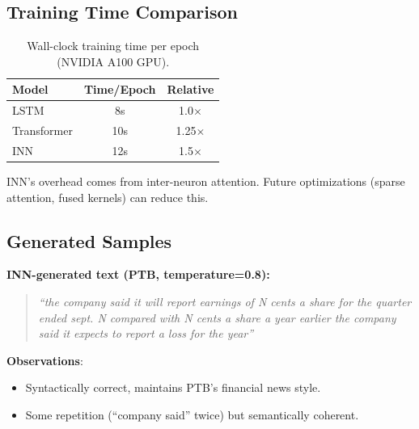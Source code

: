 \documentclass{article}
\begin{document}
\subsection{Training Time Comparison}

\begin{table}[h]
\centering
\caption{Wall-clock training time per epoch (NVIDIA A100 GPU).}
\begin{tabular}{lcc}
\toprule
\textbf{Model} & \textbf{Time/Epoch} & \textbf{Relative} \\
\midrule
LSTM & 8s & 1.0$\times$ \\
Transformer & 10s & 1.25$\times$ \\
INN & 12s & 1.5$\times$ \\
\bottomrule
\end{tabular}
\end{table}

INN's overhead comes from inter-neuron attention. Future optimizations (sparse attention, fused kernels) can reduce this.

\subsection{Generated Samples}

\textbf{INN-generated text (PTB, temperature=0.8):}

\begin{quote}
\textit{``the company said it will report earnings of N cents a share for the quarter ended sept. N compared with N cents a share a year earlier the company said it expects to report a loss for the year''}
\end{quote}

\textbf{Observations}:
\begin{itemize}
    \item Syntactically correct, maintains PTB's financial news style.
    \item Some repetition (``company said'' twice) but semantically coherent.
\end{itemize}
\end{document}
